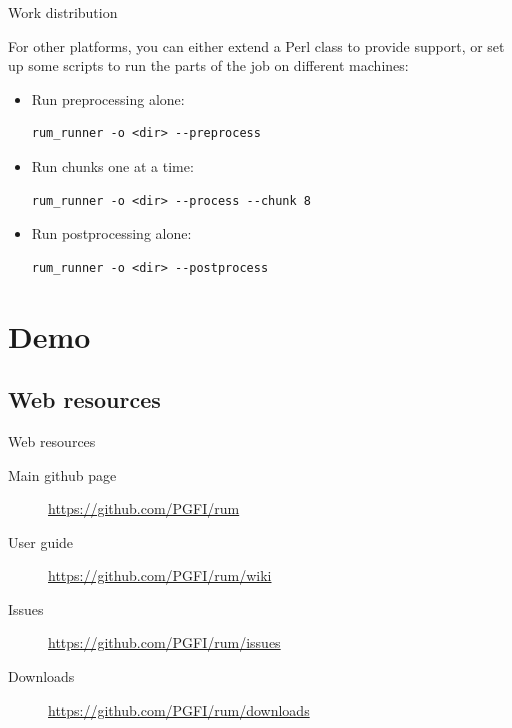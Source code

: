 \documentclass{beamer}
\begin{document}
\begin{frame}[fragile]{Work distribution}

For other platforms, you can either extend a Perl class to provide
support, or set up some scripts to run the parts of the job on
different machines:

\pause

\begin{itemize}
\item  Run preprocessing alone:

\begin{verbatim}
rum_runner -o <dir> --preprocess
\end{verbatim}

\pause

\item Run chunks one at a time:

\begin{verbatim}
rum_runner -o <dir> --process --chunk 8
\end{verbatim}

\pause

\item Run postprocessing alone:

\begin{verbatim}
rum_runner -o <dir> --postprocess
\end{verbatim}

\end{itemize}

\end{frame}

\section{Demo}

\subsection{Web resources}

\begin{frame}{Web resources}
  \begin{description}
    \item [Main github page] 
      \url{https://github.com/PGFI/rum}

    \item [User guide] 
      \url{https://github.com/PGFI/rum/wiki}

    \item [Issues] 
      \url{https://github.com/PGFI/rum/issues}

    \item [Downloads] 
      \url{https://github.com/PGFI/rum/downloads}
    
  \end{description}
\end{frame}
\end{document}
